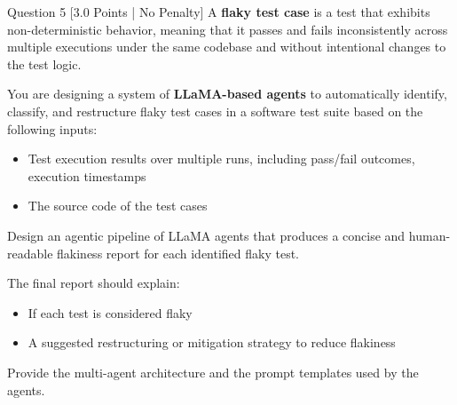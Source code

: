\documentclass[11pt,a4paper]{article}
\begin{document}
\vspace{0.3cm}

\begin{questionbox}{Question 5 \hfill [3.0 Points | No Penalty]}
A \textbf{flaky test case} is a test that exhibits non-deterministic behavior, meaning that it passes and fails inconsistently across multiple executions under the same codebase and without intentional changes to the test logic.

You are designing a system of \textbf{LLaMA-based agents} to automatically identify, classify, and restructure flaky test cases in a software test suite based on the following inputs:
\begin{itemize}[leftmargin=2em,itemsep=1pt]
    \item Test execution results over multiple runs, including pass/fail outcomes, execution timestamps
    \item The source code of the test cases
\end{itemize}
Design an agentic pipeline of LLaMA agents that produces a concise and human-readable flakiness report for each identified flaky test.

The final report should explain:
\begin{itemize}[leftmargin=2em,itemsep=1pt]
    \item If each test is considered flaky
    \item A suggested restructuring or mitigation strategy to reduce flakiness
\end{itemize}
Provide the multi-agent architecture and the prompt templates used by the agents.
\end{questionbox}

\vspace{0.3cm}
\end{document}
